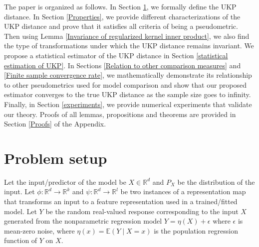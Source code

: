 \documentclass[11pt]{article}
\newcommand{\R}{\mathbb{R}}
\newcommand{\E}{\mathbb{E}}
\newcommand{\repone}{\phi}
\newcommand{\reptwo}{\psi}
\newcommand{\metricstname}{UKP }
\theoremstyle{plain}
\begin{document}
The paper is organized as follows. In Section \ref{Problem Setup}, we formally define the \metricstname distance. In Section \ref{Properties}, we provide different characterizations of the \metricstname distance and prove that it satisfies all criteria of being a pseudometric. Then using Lemma \ref{Invariance of regularized kernel inner product}, we also find the type of transformations under which the \metricstname distance remains invariant. We propose a statistical estimator of the \metricstname distance in Section \ref{statistical estimation of UKP}. In Sections \ref{Relation to other comparison measures} and \ref{Finite sample convergence rate}, we mathematically demonstrate its relationship to other pseudometrics used for model comparison and show that our proposed estimator converges to the true \metricstname distance as the sample size goes to infinity. Finally, in Section \ref{experiments}, we provide numerical experiments that validate our theory. Proofs of all lemmas, propositions and theorems are provided in Section \ref{Proofs} of the Appendix. 

\section{Problem setup}\label{Problem Setup}

Let the input/predictor of the model be $X \in \R^d$ and $P_{X}$ be the distribution of the input. Let $\repone: \R^d \to \R^k$ and $\reptwo: \R^d \to \R^l$ be two instances of a representation map that transforms an input to a feature representation used in a trained/fitted model. Let $Y$ be the random real-valued response corresponding to the input $X$ generated from the nonparametric regression model $Y=\eta(X) + \epsilon$ where $\epsilon$ is mean-zero noise, where $\eta(x) = \E(Y \mid X = x)$ is the population regression function of $Y$ on $X$.
\end{document}
